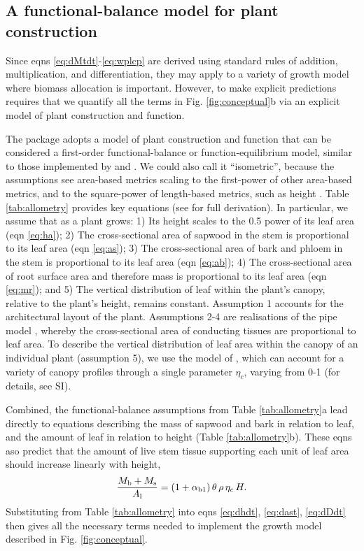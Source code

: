\documentclass[9pt,twocolumn,twoside,lineno]{pnas-new}
\begin{document}
\subsection{A functional-balance model for plant construction}

Since eqns \ref{eq:dMtdt}-\ref{eq:wplcp} are derived using standard rules of addition, multiplication, and differentiation, they may apply to a variety of growth model where biomass allocation is important. However, to make explicit predictions requires that we quantify all the terms in Fig. \ref{fig:conceptual}b via an explicit model of plant construction and function.

The {\plant} package adopts a model of plant construction and function that can be considered a first-order functional-balance or function-equilibrium model, similar to those implemented by \citep{Makela-1997} and \citep{Moorcroft-2001}. We could also call it ``isometric'', because the assumptions see area-based metrics scaling to the first-power of other area-based metrics, and to the square-power of length-based metrics, such as height \citep{Huxley-1932}. Table \ref{tab:allometry} provides key equations (see \citep{Falster-2016} for full derivation). In particular, we assume that as a plant grows:
1) Its height scales to the 0.5 power of its leaf area (eqn \ref{eq:ha});
2) The cross-sectional area of sapwood in the stem is proportional to its leaf area (eqn \ref{eq:as});
3) The cross-sectional area of bark and phloem in the stem  is proportional to its leaf area (eqn \ref{eq:ab});
4) The cross-sectional area of root surface area and therefore mass is proportional to its leaf area (eqn \ref{eq:mr}); and
5) The vertical distribution of leaf within the plant's canopy, relative to the plant's height, remains constant.
Assumption 1 accounts for the architectural layout of the plant. Assumptions 2-4 are realisations of the pipe model \citep{Shinozaki-1964}, whereby the cross-sectional area of conducting tissues are proportional to leaf area. To describe the vertical distribution of leaf area within the canopy of an individual plant (assumption 5), we use the model of \citep{Yokozawa-1995}, which can account for a variety of canopy profiles through a single parameter $\eta_c$, varying from 0-1 (for details, see SI).

Combined, the functional-balance assumptions from Table \ref{tab:allometry}a lead directly to equations describing the mass of sapwood and bark in relation to leaf, and the amount of leaf in relation to height (Table \ref{tab:allometry}b). These eqns aso predict that the amount of live stem tissue supporting each unit of leaf area should increase linearly with height,
\begin{equation}\label{eq:msml}
\frac{M_{\rm b} + M_{\rm s}}{A_{\rm l}} = (1+ \alpha_{\rm b1}) \,\theta \, \rho \, \eta_c \, H.
\end{equation}
Substituting from Table \ref{tab:allometry} into eqns \ref{eq:dhdt}, \ref{eq:dast}, \ref{eq:dDdt} then gives all the necessary terms needed to implement the growth model described in Fig. \ref{fig:conceptual}. 
\end{document}
